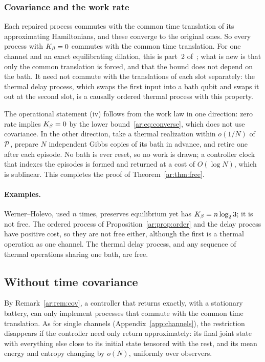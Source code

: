 \subsubsection{Covariance and the work rate}

Each repaired process commutes with the common time translation of its approximating Hamiltonians, and these converge to the original ones. So every process with $K_\beta=0$ commutes with the common time translation. For one channel and an exact equilibrating dilation, this is part~2 of~\cite[Prop.~4]{LieEtAl26}; what is new is that only the common translation is forced, and that the bound does not depend on the bath. It need not commute with the translations of each slot separately: the thermal delay process, which swaps the first input into a bath qubit and swaps it out at the second slot, is a causally ordered thermal process with this property.

The operational statement (iv) follows from the work law in one direction: zero rate implies $K_\beta=0$ by the lower bound~\eqref{ar:eq:converse}, which does not use covariance. In the other direction, take a thermal realization within $o(1/N)$ of $\mathcal P$, prepare $N$ independent Gibbs copies of its bath in advance, and retire one after each episode. No bath is ever reset, so no work is drawn; a controller clock that indexes the episodes is formed and returned at a cost of $O(\log N)$, which is sublinear. This completes the proof of Theorem~\ref{ar:thm:free}.

\paragraph{Examples.} Werner--Holevo, used $n$ times, preserves equilibrium yet has $K_\beta=n\log_23$; it is not free. The ordered process of Proposition~\ref{ar:prop:order} and the delay process have positive cost, so they are not free either, although the first is a thermal operation as one channel. The thermal delay process, and any sequence of thermal operations sharing one bath, are free.

\subsection{Without time covariance}\label{ar:sec:noncov}

By Remark~\ref{ar:rem:cov}, a controller that returns exactly, with a stationary battery, can only implement processes that commute with the common time translation. As for single channels (Appendix~\ref{app:channels}), the restriction disappears if the controller need only return approximately: its final joint state with everything else close to its initial state tensored with the rest, and its mean energy and entropy changing by $o(N)$, uniformly over observers.

